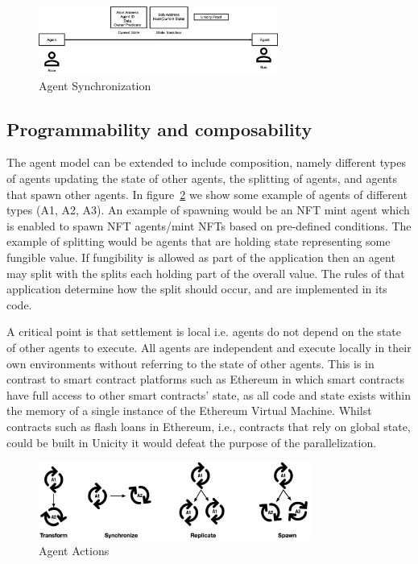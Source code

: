 \documentclass{article}
\begin{document}
\begin{figure}[H]
    \centering
    \includegraphics[width=0.7\textwidth]{AgentSynchronization.png}
    \caption{Agent Synchronization}
    \label{fig:AgentSynch}
\end{figure}


\subsection{Programmability and composability}

The agent model can be extended to include composition, namely different types of agents updating the state of other agents, the splitting of agents, and agents that spawn other agents. In figure~\ref{fig:AgentSpawn} we show some example of agents of different types (A1, A2, A3). An example of spawning would be an NFT mint agent which is enabled to spawn NFT agents/mint NFTs based on pre-defined conditions. The example of splitting would be agents that are holding state representing some fungible value. If fungibility is allowed as part of the application then an agent may split with the splits each holding part of the overall value. The rules of that application determine how the split should occur, and are implemented in its code.



A critical point is that settlement is local i.e. agents do not depend on the state of other agents to execute. All agents are independent and execute locally in their own environments without referring to the state of other agents. This is in contrast to smart contract platforms such as Ethereum in which smart contracts have full access to other smart contracts' state, as all code and state exists within the memory of a single instance of the Ethereum Virtual Machine. Whilst contracts such as flash loans in Ethereum, i.e., contracts that rely on global state, could be built in Unicity it would defeat the purpose of the parallelization.

\begin{figure}[H]
    \centering
    \includegraphics[width=0.8\textwidth]{Replication.png}
    \caption{Agent Actions}
    \label{fig:AgentSpawn}
\end{figure}
\end{document}
